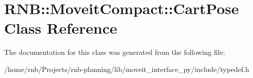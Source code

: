\hypertarget{class_r_n_b_1_1_moveit_compact_1_1_cart_pose}{}\section{R\+NB\+:\+:Moveit\+Compact\+:\+:Cart\+Pose Class Reference}
\label{class_r_n_b_1_1_moveit_compact_1_1_cart_pose}


The documentation for this class was generated from the following file\+:\begin{DoxyCompactItemize}
\item 
/home/rnb/\+Projects/rnb-\/planning/lib/moveit\+\_\+interface\+\_\+py/include/typedef.\+h\end{DoxyCompactItemize}
